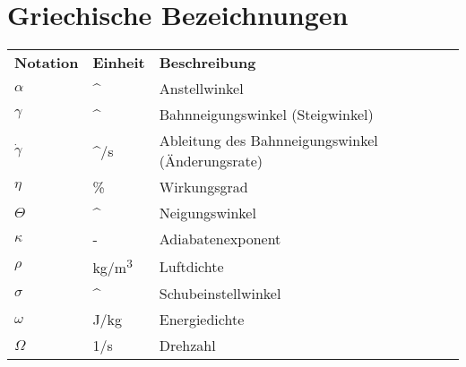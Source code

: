 \section*{Griechische Bezeichnungen}
\begin{longtable}{lp{2.5cm}p{10.5cm}}
	\textbf{Notation} & \textbf{Einheit} & \textbf{Beschreibung}\\
	\ensuremath{\alpha}	& \si{^\circ}		& Anstellwinkel \\
	\ensuremath{\gamma}	& \si{^\circ}		& Bahnneigungswinkel (Steigwinkel)\\
	\ensuremath{\dot{\gamma}}& \si{^\circ /s}& Ableitung des Bahnneigungswinkel (Änderungsrate) \\
	\ensuremath{\eta}	& \si{\%}			& Wirkungsgrad \\
	\ensuremath{\Theta} & \si{^\circ}		& Neigungswinkel \\
	\ensuremath{\kappa}	& -					& Adiabatenexponent \\
	\ensuremath{\rho}	& \si{kg/m^3}		& Luftdichte \\
	\ensuremath{\sigma}	& \si{^\circ}		& Schubeinstellwinkel\\
	\ensuremath{\omega}	& \si{J/kg}			& Energiedichte \\
	\ensuremath{\Omega}	& \si{1/s}			& Drehzahl
	
		
	
	
\end{longtable}
%
